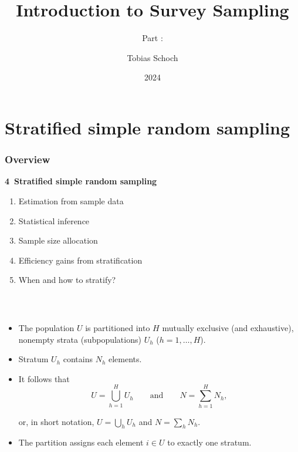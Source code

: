 \documentclass{my_eth_beamer}
\title{Introduction to Survey Sampling}
\subtitle{Part \NR: \TITLE}
\author[Tobias Schoch]{Tobias Schoch}
\date{2024}
\numberwithin{equation}{section}
\newcommand{\TITLE}{Stratified simple random sampling}
\newcommand{\NR}{4}
\begin{document}

\section{\TITLE}\label{sec:strat}
\setcounter{section}{\NR}
\setcounter{Bsp}{12}
\setcounter{Def}{10}
\setcounter{EinSatz}{1}


\begin{frame}
    \frametitle{Overview}
    \noindent \hspace{0.2em}\textcolor{fhnwblue}{\bfseries \NR~\TITLE}
    \begin{enumerate}[\NR.1]
        \item Estimation from sample data
        \item Statistical inference
        \item Sample size allocation
        \item Efficiency gains from stratification
        \item When and how to stratify?
    \end{enumerate}
\end{frame}

\begin{frame}
    \frametitle{\insertsectionnumber~\insertsection}
    \begin{itemize}
    \setlength{\itemsep}{14pt}
        \item The population $U$ is \alert{partitioned} into $H$ mutually
            exclusive (and exhaustive), nonempty \alert{strata}
            (subpopulations) $U_h$ ($h = 1, \ldots, H$).
        \item Stratum $U_h$ contains $N_h$ elements.
        \item It follows that
            \begin{equation*}
                U = \bigcup_{h = 1}^H U_h \qquad \text{and}
                    \qquad N = \sum_{h = 1}^H N_h,
            \end{equation*}

            \vspace{1em}

            \noindent or, in short notation, $U = \bigcup_h U_h$ and $N =
            \sum_h N_h$.
        \item The partition \alert{assigns} each element $i \in U$ to exactly
            one stratum.
    \end{itemize}
\end{frame}
\end{document}
